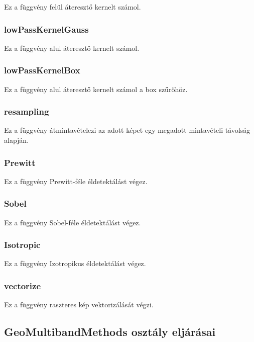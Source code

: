 \documentclass[a4paper,12pt]{article}
\begin{document}
Ez a függvény felül áteresztő kernelt számol.

\subsubsection{lowPassKernelGauss}

Ez a függvény alul áteresztő kernelt számol.

\subsubsection{lowPassKernelBox}

Ez a függvény alul áteresztő kernelt számol a box szűrőhöz.

\subsubsection{resampling}

Ez a függvény átmintavételezi az adott képet egy megadott mintavételi távolság alapján.

\subsubsection{Prewitt}

Ez a függvény Prewitt-féle éldetektálást végez.

\subsubsection{Sobel}

Ez a függvény Sobel-féle éldetektálást végez.

\subsubsection{Isotropic}

Ez a függvény Izotropikus éldetektálást végez.

\subsubsection{vectorize}

Ez a függvény raszteres kép vektorizálását végzi.


\subsection{\textbf{GeoMultibandMethods} osztály eljárásai}
\end{document}
